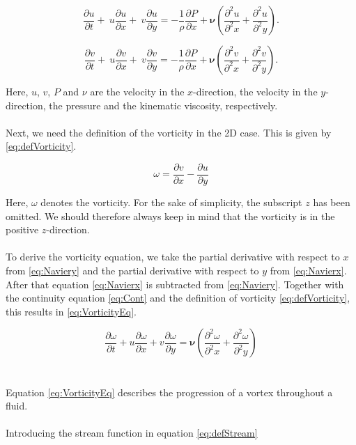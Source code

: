 \documentclass[fleqn,12pt]{NTFD} %
\begin{document}
\begin{equation}
 \frac{\partial u}{\partial t}  + \ u \frac{\partial u}{\partial x} +\ v \frac{\partial u}{\partial y} = -\frac{1}{\rho} \frac{\partial P}{\partial x} +  \boldsymbol{\nu} \left(\frac{\partial^2 u}{\partial^2 x} + \frac{\partial^2 u}{\partial^2 y} \right) .
\label{eq:Navierx}
\end{equation}

\begin{equation}
\frac{\partial v}{\partial t} + \ u \frac{\partial v} {\partial x} +   \ v \frac{\partial v}{\partial y} = -\frac{1}{\rho} \frac{\partial P}{\partial x} +  \boldsymbol{\nu} \left(\frac{\partial^2 v}{\partial^2 x} + \frac{\partial^2 v}{\partial^2 y} \right) .
\label{eq:Naviery}
\end{equation}

Here, $u$, $v$, $P$ and $\nu$ are the velocity in the $x$-direction, the velocity in the $y$-direction, the pressure and the kinematic viscosity, respectively.  
\\
\\
Next, we need the definition of the vorticity in the 2D case. This is given by \eqref{eq:defVorticity}.

\begin{equation}
\omega = \frac{\partial v}{\partial x} - \frac{\partial u}{\partial y}
\label{eq:defVorticity}
\end{equation}

Here, $\omega$ denotes the vorticity. For the sake of simplicity, the subscript $z$ has been omitted. We should therefore always keep in mind that the vorticity is in the positive $z$-direction.
\\
\\
To derive the vorticity equation, we take the partial derivative with respect to $x$ from \eqref{eq:Naviery} and the partial derivative with respect to $y$ from \eqref{eq:Navierx}. After that equation \eqref{eq:Navierx} is subtracted from \eqref{eq:Naviery}. Together with the continuity equation \eqref{eq:Cont} and the definition of vorticity \eqref{eq:defVorticity}, this results in \eqref{eq:VorticityEq}.

\begin{equation}
\frac{\partial \omega}{\partial t} + u \frac{\partial \omega}{\partial x} +  v \frac{\partial \omega}{\partial y} = \boldsymbol{\nu}\left(\frac{\partial^2 \omega}{\partial^2 x} + \frac{\partial^2 \omega}{\partial^2 y}\right)
\label{eq:VorticityEq}
\end{equation}
\\
\\
Equation \eqref{eq:VorticityEq} describes the progression of a vortex throughout a fluid. 
\\
\\
Introducing the stream function in equation \eqref{eq:defStream}
\end{document}
